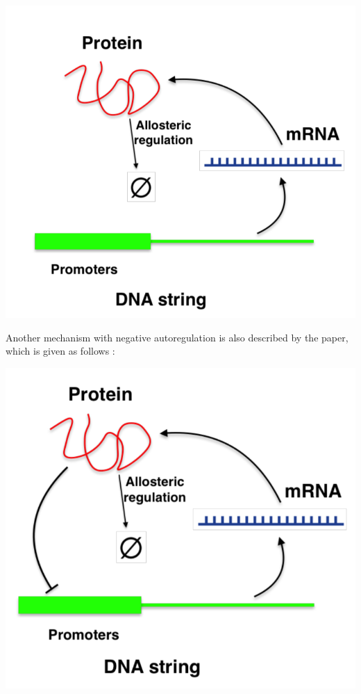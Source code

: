 \begin{center}
    \includegraphics[scale=0.4]{img/dna-noneg.png}
\end{center}

\noindent Another mechanism with negative autoregulation is 
also described by the paper, which is given as follows :

\begin{center}
    \includegraphics[scale=0.4]{img/dna-neg.png}
\end{center}

